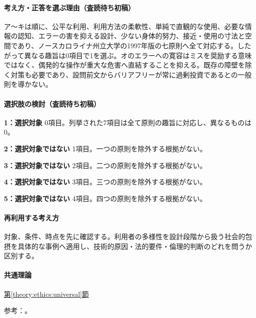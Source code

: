 \paragraph{考え方・正答を選ぶ理由（査読待ち初稿）} ア〜キは順に、公平な利用、利用方法の柔軟性、単純で直観的な使用、必要な情報の認知、エラーの害を抑える設計、少ない身体的努力、接近・使用の寸法と空間であり、ノースカロライナ州立大学の1997年版の七原則へ全て対応する。したがって異なる趣旨は0項目で1を選ぶ。オのエラーへの寛容はミスを奨励する意味ではなく、偶発的な操作が重大な危害へ直結することを抑える。既存の障壁を除く対策も必要であり、設問前文からバリアフリーが常に過剰投資であるとの一般則を導かない。

\paragraph{選択肢の検討（査読待ち初稿）}\mbox{}\par

\noindent\textbf{1：選択対象} 0項目。列挙された7項目は全て原則の趣旨に対応し、異なるものは0。\par

\noindent\textbf{2：選択対象ではない} 1項目。一つの原則を除外する根拠がない。\par

\noindent\textbf{3：選択対象ではない} 2項目。二つの原則を除外する根拠がない。\par

\noindent\textbf{4：選択対象ではない} 3項目。三つの原則を除外する根拠がない。\par

\noindent\textbf{5：選択対象ではない} 4項目。四つの原則を除外する根拠がない。\par

\paragraph{再利用する考え方} 対象、条件、時点を先に確認する。利用者の多様性を設計段階から扱う社会的包摂を具体的な事例へ適用し、技術的原因・法的要件・倫理的判断のどれを問うか区別する。

\paragraph{共通理論} \hyperref[theory:ethics:universal]{第\ref*{theory:ethics:universal}節}

\par 参考：\cite{ncsu_ud1997}。

